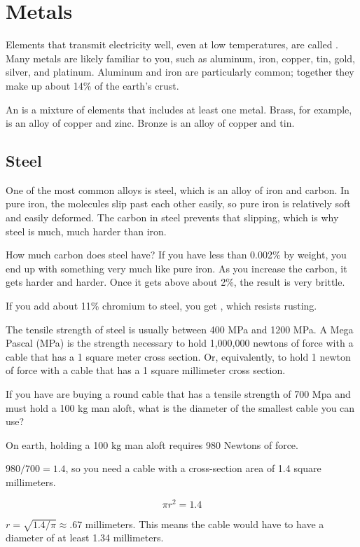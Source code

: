 \chapter{Metals}

Elements that transmit electricity well, even at low temperatures, are
called . Many metals are likely familiar to you, such as
aluminum, iron, copper, tin, gold, silver, and platinum. Aluminum and
iron are particularly common; together they make up about 14\% of the
earth's crust.

An  is a mixture of elements that includes at least one
metal. Brass, for example, is an alloy of copper and zinc.  Bronze is
an alloy of copper and tin.



\section{Steel}

One of the most common alloys is steel, which is an alloy of iron and carbon.
In pure iron, the molecules slip past each other easily, so pure iron
is relatively soft and easily deformed. The carbon in steel prevents
that slipping, which is why steel is much, much harder than iron.

How much carbon does steel have? If you have less than 0.002\% by weight, you end up
with something very much like pure iron.  As you increase the carbon,
it gets harder and harder. Once it gets above about 2\%, the result
is very brittle.

If you add about 11\% chromium to steel, you get , which resists rusting.

\begin{Exercise}[title={Tensile Strength}, label=tensile-mpa]

The tensile strength of steel is usually between 400 MPa and 1200
MPa. A Mega Pascal (MPa) is the strength necessary to hold 1,000,000 newtons of
force with a cable that has a 1 square meter cross section. Or,
equivalently, to hold 1 newton of force with a cable that has a 1
square millimeter cross section. 

If you have are buying a round cable that has a tensile strength of
700 Mpa and must hold a 100 kg man aloft, what is the diameter of the
smallest cable you can use?
  
\end{Exercise}
\begin{Answer}[ref=tensile-mpa]
On earth, holding a 100 kg man aloft requires 980 Newtons of force.

$980/700 = 1.4$, so you need a cable with a cross-section area of 1.4
square millimeters.

$$\pi r^2 = 1.4$$

$r = \sqrt{1.4/\pi} \approx .67$ millimeters. This means the cable would
have to have a diameter of at least 1.34 millimeters.

\end{Answer}

